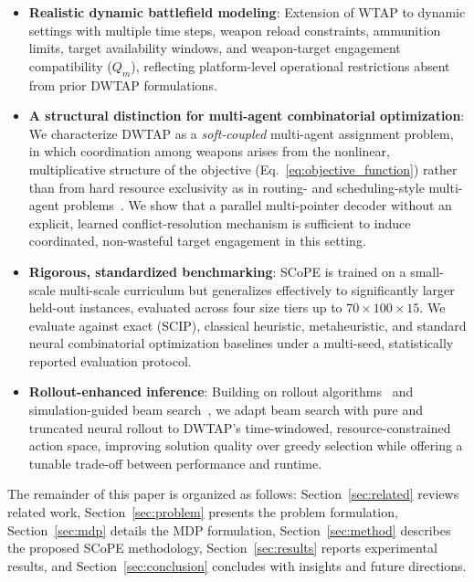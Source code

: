 \documentclass[smallcondensed]{svjour3}
\begin{document}
\begin{itemize}
    \item \textbf{Realistic dynamic battlefield modeling}: Extension of WTAP to dynamic settings with multiple time steps, weapon reload constraints, ammunition limits, target availability windows, and weapon-target engagement compatibility ($Q_m$), reflecting platform-level operational restrictions absent from prior DWTAP formulations.

    \item \textbf{A structural distinction for multi-agent combinatorial optimization}: We characterize DWTAP as a \emph{soft-coupled} multi-agent assignment problem, in which coordination among weapons arises from the nonlinear, multiplicative structure of the objective (Eq.~\eqref{eq:objective_function}) rather than from hard resource exclusivity as in routing- and scheduling-style multi-agent problems~\cite{parco2024}. We show that a parallel multi-pointer decoder without an explicit, learned conflict-resolution mechanism is sufficient to induce coordinated, non-wasteful target engagement in this setting.

    \item \textbf{Rigorous, standardized benchmarking}: SCoPE is trained on a small-scale multi-scale curriculum but generalizes effectively to significantly larger held-out instances, evaluated across four size tiers up to $70 \times 100 \times 15$. We evaluate against exact (SCIP), classical heuristic, metaheuristic, and standard neural combinatorial optimization baselines under a multi-seed, statistically reported evaluation protocol.

    \item \textbf{Rollout-enhanced inference}: Building on rollout algorithms~\cite{bertsekas1997rollout} and simulation-guided beam search~\cite{choo2022sgbs}, we adapt beam search with pure and truncated neural rollout to DWTAP's time-windowed, resource-constrained action space, improving solution quality over greedy selection while offering a tunable trade-off between performance and runtime.
\end{itemize}

The remainder of this paper is organized as follows: Section~\ref{sec:related} reviews related work, Section~\ref{sec:problem} presents the problem formulation, Section~\ref{sec:mdp} details the MDP formulation, Section~\ref{sec:method} describes the proposed SCoPE methodology, Section~\ref{sec:results} reports experimental results, and Section~\ref{sec:conclusion} concludes with insights and future directions.
\end{document}
